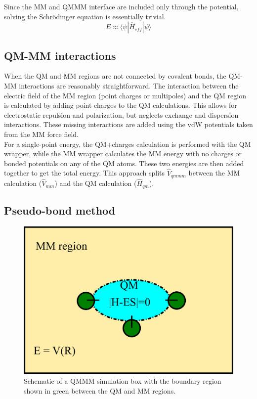\documentclass[12pt]{report}
\begin{document}
Since the MM and QMMM interface are included only through the potential,
solving the Schr\"odinger equation is essentially trivial.
\begin{equation}
 E \approx \langle \psi |\hat H_{eff}|\psi \rangle
\end{equation}

\subsection{QM-MM interactions}

When the QM and MM regions are not connected by covalent bonds, the QM-MM
interactions are reasonably straightforward. The interaction between the
electric field of the MM region (point charges or multipoles) and the QM
region is calculated by adding point charges to the QM calculations. This
allows for electrostatic repulsion and polarization, but neglects exchange
and dispersion interactions. These missing interactions are added using the
vdW potentials taken from the MM force field. \\

For a single-point energy, the QM+charges calculation is performed with the QM
wrapper, while the MM wrapper calculates the MM energy with no charges or
bonded potentials on any of the QM atoms. These two energies are then added
together to get the total energy. This approach splits $\hat V_{qmmm}$ between
the MM calculation ($\hat V_{mm}$) and the QM calculation ($\hat H_{qm}$). 

\FloatBarrier

\subsection{Pseudo-bond method}

\begin{figure}[hbt]
 \centering
 \includegraphics[scale=0.50]{../doc/images/QMMM_2.png}
 \caption{Schematic of a QMMM simulation box with the boundary region shown in
 green between the QM and MM regions.}
 \label{fig:QMMM2}
\end{figure} 
\end{document}
